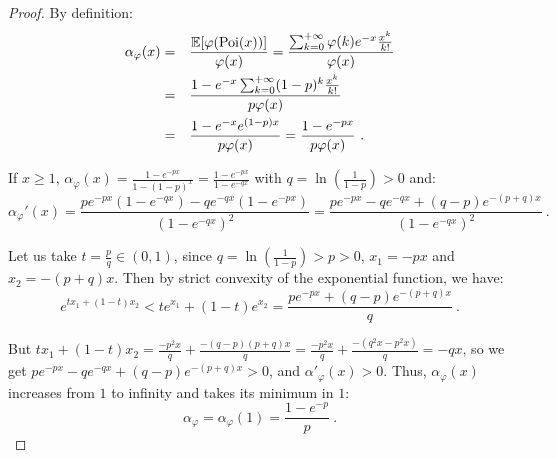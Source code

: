 \begin{proof}
    By definition:   
    \begin{equation}
      \begin{aligned}
        \alpha_{\varphi}(x) &=&& \frac{\mathbb{E}[\varphi(\operatorname{\text{Poi}}(x))]}{\varphi(x)} = \frac{\sum_{k=0}^{+\infty}\varphi(k)e^{-x}\frac{x^k}{k!}}{\varphi(x)}\\
        &=&& \frac{1-e^{-x}\sum_{k=0}^{+\infty}(1-p)^k\frac{x^k}{k!}}{p\varphi(x)}\\
        &=&& \frac{1 - e^{-x}e^{(1-p)x}}{p\varphi(x)} = \frac{1 - e^{-px}}{p\varphi(x)} \ .
      \end{aligned}
    \end{equation}

    If $x \geq 1$, $\alpha_{\varphi}(x) = \frac{1 - e^{-px}}{1-(1-p)^x} = \frac{1 - e^{-px}}{1-e^{-qx}}$ with $q = \ln(\frac{1}{1-p}) > 0$ and:
    \[\alpha_{\varphi}'(x) = \frac{pe^{-px}(1-e^{-qx}) - qe^{-qx}(1-e^{-px})}{(1-e^{-qx})^2} = \frac{pe^{-px} - qe^{-qx} + (q-p)e^{-(p+q)x}}{(1-e^{-qx})^2} \ .\]

    Let us take $t = \frac{p}{q} \in (0,1)$, since $q = \ln(\frac{1}{1-p}) > p > 0$, $x_1 = -px$ and $x_2 = -(p + q)x$. Then by strict convexity of the exponential function, we have:
    \[ e^{tx_1 + (1-t)x_2} < te^{x_1} + (1-t)e^{x_2} = \frac{pe^{-px} + (q-p)e^{-(p+q)x}}{q} \ .\]

    But $tx_1 + (1-t)x_2 = \frac{-p^2x}{q} + \frac{-(q-p)(p+q)x}{q}  = \frac{-p^2x}{q} + \frac{-(q^2x-p^2x)}{q} = -qx$, so we get $pe^{-px} - qe^{-qx} + (q-p)e^{-(p+q)x} > 0$, and $\alpha'_{\varphi}(x) > 0$. Thus, $\alpha_{\varphi}(x)$ increases from $1$ to infinity and takes its minimum in $1$:  
    \[\alpha_{\varphi} = \alpha_{\varphi}(1) = \frac{1 - e^{-p}}{p} \ .\]
\end{proof}

